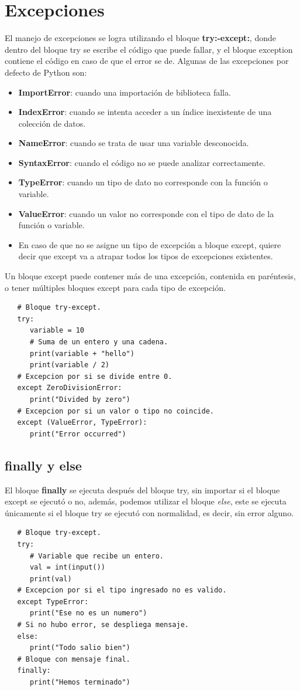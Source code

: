 \section{Excepciones}
\hspace{0.55cm}El manejo de excepciones se logra utilizando el bloque \textbf{try:-except:}, donde dentro del bloque try se escribe el código que puede fallar, y el bloque exception contiene el código en caso de que el error se de. Algunas de las excepciones por defecto de Python son:
\begin{itemize}
	\item \textbf{ImportError}: cuando una importación de biblioteca falla.
	\item \textbf{IndexError}: cuando se intenta acceder a un índice inexistente de una colección de datos.
	\item \textbf{NameError}: cuando se trata de usar una variable desconocida.
	\item \textbf{SyntaxError}: cuando el código no se puede analizar correctamente.
	\item \textbf{TypeError}: cuando un tipo de dato no corresponde con la función o variable.
	\item \textbf{ValueError}: cuando un valor no corresponde con el tipo de dato de la función o variable.
	\item En caso de que no se asigne un tipo de excepción a bloque except, quiere decir que except va a atrapar todos los tipos de excepciones existentes.
\end{itemize}

Un bloque except puede contener más de una excepción, contenida en paréntesis, o tener múltiples bloques except para cada tipo de excepción.
\begin{lstlisting}
   # Bloque try-except.   
   try:
      variable = 10
      # Suma de un entero y una cadena.
      print(variable + "hello")
      print(variable / 2)
   # Excepcion por si se divide entre 0.
   except ZeroDivisionError:
      print("Divided by zero")
   # Excepcion por si un valor o tipo no coincide.
   except (ValueError, TypeError):
      print("Error occurred")
\end{lstlisting}


\subsection{finally y else}
\hspace{0.55cm}El bloque \textbf{finally} se ejecuta después del bloque try, sin importar si el bloque except se ejecutó o no, además, podemos utilizar el bloque \textit{else}, este se ejecuta únicamente si el bloque try se ejecutó con normalidad, es decir, sin error alguno.
\begin{lstlisting}
   # Bloque try-except.   
   try:
      # Variable que recibe un entero.
      val = int(input())
      print(val)
   # Excepcion por si el tipo ingresado no es valido.
   except TypeError:
      print("Ese no es un numero")
   # Si no hubo error, se despliega mensaje.
   else:
      print("Todo salio bien")
   # Bloque con mensaje final.
   finally:
      print("Hemos terminado")
\end{lstlisting}


